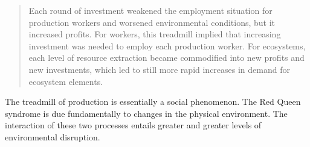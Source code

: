 %

\begin{quote}
	Each round of investment weakened the employment situation 
	for production workers and worsened environmental conditions, 
	but it increased profits. 
	For workers, this treadmill implied that increasing investment 
	was needed to employ each production worker. 
	For ecosystems, each level of resource extraction became 
	commodified into new profits and new investments, 
	which led to still more rapid increases in demand 
	for ecosystem elements.~\cite[p.296]{Gould2004}
\end{quote}

The treadmill of production is essentially a social phenomenon.
The Red Queen syndrome is due fundamentally to changes in the physical environment.
The interaction of these two processes entails 
greater and greater levels of environmental disruption.

